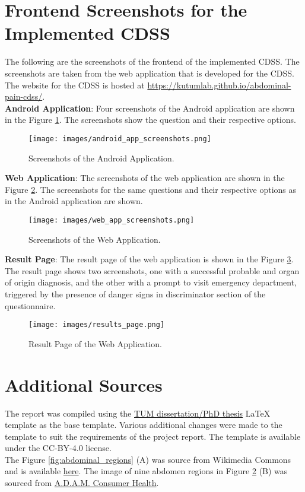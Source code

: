 \section{Frontend Screenshots for the Implemented CDSS}
\label{appendix:frontend_screenshots}
The following are the screenshots of the frontend of the implemented CDSS. The screenshots are taken from the web application that is developed for the CDSS. The website for the CDSS is hosted at \url{https://kutumlab.github.io/abdominal-pain-cdss/}.\\[\baselineskip]

\noindent \textbf{Android Application}: Four screenshots of the Android application are shown in the Figure \ref{fig:android_app_screenshots}. The screenshots show the question and their respective options.
\begin{figure}[H]
    \centering
    \texttt{[image: images/android\_app\_screenshots.png]}
    \caption{Screenshots of the Android Application.}
    \label{fig:android_app_screenshots}
\end{figure}

\noindent \textbf{Web Application}: The screenshots of the web application are shown in the Figure \ref{fig:web_app_screenshots}. The screenshots for the same questions and their respective options as in the Android application are shown.
\begin{figure}[H]
    \centering
    \texttt{[image: images/web\_app\_screenshots.png]}
    \caption{Screenshots of the Web Application.}
    \label{fig:web_app_screenshots}
\end{figure}

\noindent \textbf{Result Page}: The result page of the web application is shown in the Figure \ref{fig:results_page}. The result page shows two screenshots, one with a successful probable and organ of origin diagnosis, and the other with a prompt to visit emergency department, triggered by the presence of danger signs in discriminator section of the questionnaire.
\begin{figure}[H]
    \centering
    \texttt{[image: images/results\_page.png]}
    \caption{Result Page of the Web Application.}
    \label{fig:results_page}
\end{figure}

\section{Additional Sources}
\label{appendix:sources}
The report was compiled using the \href{https://github.com/TUM-LIS/tum-dissertation-latex}{TUM dissertation/PhD thesis} LaTeX template as the base template. Various additional changes were made to the template to suit the requirements of the project report. The template is available under the CC-BY-4.0 license.\\[\baselineskip]

\noindent The Figure \ref{fig:abdominal_regions} (A) was source from Wikimedia Commons and is available \href{https://commons.wikimedia.org/wiki/File:Gray1220-es.svg}{here}. The image of nine abdomen regions in Figure \ref{fig:web_app_screenshots} (B) was sourced from \href{https://www.adam.com/}{A.D.A.M. Consumer Health}.